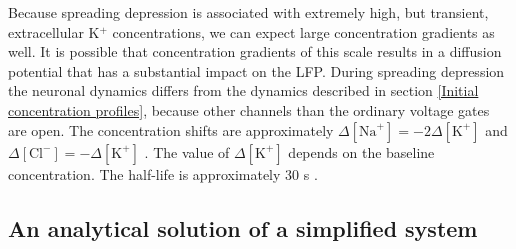 \documentclass{article}
\begin{document}
Because spreading depression is associated with extremely high, but transient, extracellular K$^+$ concentrations, we can expect large concentration gradients as well. It is possible that concentration gradients of this scale results in a diffusion potential that has a substantial impact on the LFP. During spreading depression the neuronal dynamics differs from the dynamics described in section \ref{Initial concentration profiles}, because other channels than the ordinary voltage gates are open. The concentration shifts are approximately $\Delta [\text{Na}^+] = -2\Delta [\text{K}^+]$ and $\Delta [\text{Cl}^-] = -\Delta[\text{K}^+]$ \cite{Herreras1993} \cite{Ataya2015}. The value of $\Delta [\text{K}^+]$ depends on the baseline concentration. The half-life is approximately 30 s \cite{Ataya2015}.

\subsection{An analytical solution of a simplified system}
\end{document}
